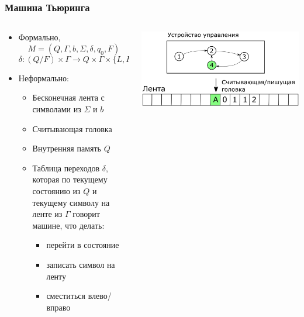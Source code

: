 \documentclass[xetex,mathserif,serif]{beamer}
\begin{document}
    \begin{frame}
        \frametitle{Машина Тьюринга}
        \begin{columns}
            \begin{column}{0.6\textwidth}
                \begin{itemize}
                    \item Формально,
                        $$M = (Q, \Gamma, b, \Sigma, \delta, q_0, F)$$
                        $$\delta : (Q / F) × \Gamma \rightarrow Q × \Gamma × \{L, R\}$$
                    \item Неформально:
                    \begin{itemize}
                        \item Бесконечная лента с символами из $\Sigma$ и $b$
                        \item Считывающая головка
                        \item Внутренняя память $Q$
                        \item Таблица переходов $\delta$, которая по текущему состоянию из $Q$ и текущему символу на ленте из $\Gamma$ говорит машине, что делать:
                        \begin{itemize}
                            \item перейти в состояние
                            \item записать символ на ленту
                            \item сместиться влево/вправо
                        \end{itemize}
                    \end{itemize}
                \end{itemize}
            \end{column}
            \begin{column}{0.4\textwidth}
                \begin{center}
                    \includegraphics[width=\textwidth]{turingMachine.png}
                \end{center}
            \end{column}
        \end{columns}
    \end{frame}
\end{document}
